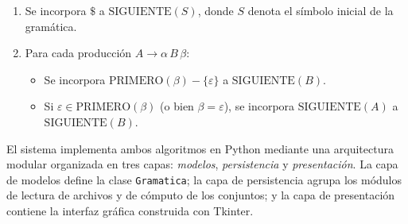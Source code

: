 \begin{enumerate}
  \item Se incorpora $\$$ a $\text{SIGUIENTE}(S)$, donde $S$ denota el símbolo inicial de
        la gramática.
  \item Para cada producción $A \to \alpha\, B\, \beta$:
  \begin{itemize}
    \item Se incorpora $\text{PRIMERO}(\beta) - \{\varepsilon\}$ a $\text{SIGUIENTE}(B)$.
    \item Si $\varepsilon \in \text{PRIMERO}(\beta)$ (o bien $\beta = \varepsilon$), se
          incorpora $\text{SIGUIENTE}(A)$ a $\text{SIGUIENTE}(B)$.
  \end{itemize}
\end{enumerate}

\vspace{0.8cm}

El sistema implementa ambos algoritmos en Python mediante una arquitectura modular organizada
en tres capas: \textit{modelos}, \textit{persistencia} y \textit{presentación}. La capa de
modelos define la clase \texttt{Gramatica}; la capa de persistencia agrupa los módulos de
lectura de archivos y de cómputo de los conjuntos; y la capa de presentación contiene la
interfaz gráfica construida con Tkinter.
